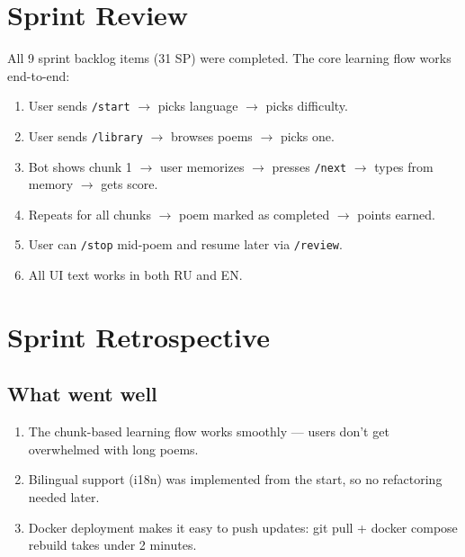 \documentclass[11pt, a4paper]{article}
\begin{document}

\section{Sprint Review}

All 9 sprint backlog items (31 SP) were completed. The core learning flow works end-to-end:

\begin{enumerate}
    \item User sends \texttt{/start} $\rightarrow$ picks language $\rightarrow$ picks difficulty.
    \item User sends \texttt{/library} $\rightarrow$ browses poems $\rightarrow$ picks one.
    \item Bot shows chunk 1 $\rightarrow$ user memorizes $\rightarrow$ presses \texttt{/next} $\rightarrow$ types from memory $\rightarrow$ gets score.
    \item Repeats for all chunks $\rightarrow$ poem marked as completed $\rightarrow$ points earned.
    \item User can \texttt{/stop} mid-poem and resume later via \texttt{/review}.
    \item All UI text works in both RU and EN.
\end{enumerate}


\section{Sprint Retrospective}

\subsection*{What went well}
\begin{enumerate}
    \item The chunk-based learning flow works smoothly --- users don't get overwhelmed with long poems.
    \item Bilingual support (i18n) was implemented from the start, so no refactoring needed later.
    \item Docker deployment makes it easy to push updates: git pull + docker compose rebuild takes under 2 minutes.
\end{enumerate}
\end{document}
